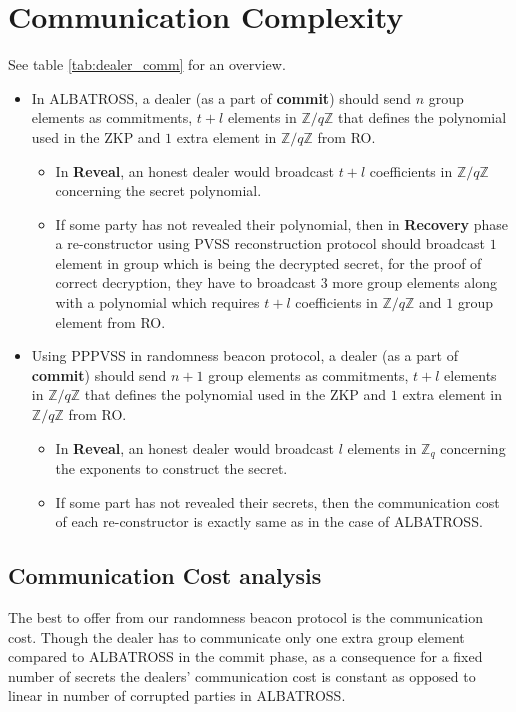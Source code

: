 \section{Communication Complexity}

See table \ref{tab:dealer_comm} for an overview.
\begin{itemize}
    \item In ALBATROSS, a dealer (as a part of \textbf{commit}) should send $n$ group elements as commitments, $t+l$ elements in $\mathbb{Z}/q\mathbb{Z}$ that defines the polynomial used in the ZKP and $1$ extra element in $\mathbb{Z}/q\mathbb{Z}$ from RO. 
    \begin{itemize}
        \item In \textbf{Reveal}, an honest dealer would broadcast $t+l$ coefficients in $\mathbb{Z}/q\mathbb{Z}$ concerning the secret polynomial.
        \item If some party has not revealed their polynomial, then in \textbf{Recovery} phase a re-constructor using PVSS reconstruction protocol should broadcast $1$ element in group which is being the decrypted secret, for the proof of correct decryption, they have to broadcast $3$ more group elements along with a polynomial which requires $t+l$ coefficients in $\mathbb{Z}/q\mathbb{Z}$ and $1$ group element from RO.
    \end{itemize}
    \item Using PPPVSS in randomness beacon protocol, a dealer (as a part of \textbf{commit}) should send $n+1$ group elements as commitments, $t+l$ elements in $\mathbb{Z}/q\mathbb{Z}$ that defines the polynomial used in the ZKP and $1$ extra element in $\mathbb{Z}/q\mathbb{Z}$ from RO.
    \begin{itemize}
        \item In \textbf{Reveal}, an honest dealer would broadcast $l$ elements in $\mathbb{Z}_q$ concerning the exponents to construct the secret.
        \item If some part has not revealed their secrets, then the communication cost of each re-constructor is exactly same as in the case of ALBATROSS.
    \end{itemize}
\end{itemize}

\subsection{Communication Cost analysis}
The best to offer from our randomness beacon protocol is the communication cost. Though the dealer has to communicate only 
one extra group element compared to ALBATROSS in the commit phase, as a consequence for a fixed number of secrets the 
dealers' communication cost is constant as opposed to linear in number of corrupted parties in ALBATROSS. 

